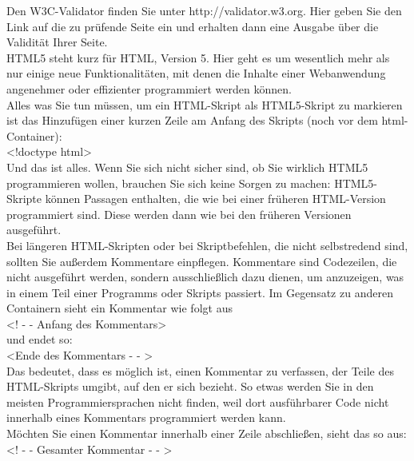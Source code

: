 Den W3C-Validator finden Sie unter http://validator.w3.org. Hier geben Sie den Link auf die zu prüfende Seite ein und erhalten dann eine Ausgabe über die Validität Ihrer Seite.\\

HTML5 steht kurz für HTML, Version 5. Hier geht es um wesentlich mehr als nur einige neue Funktionalitäten, mit denen die Inhalte einer Webanwendung angenehmer oder effizienter programmiert werden können.\\

Alles was Sie tun müssen, um ein HTML-Skript als HTML5-Skript zu markieren ist das Hinzufügen einer kurzen Zeile am Anfang des Skripts (noch vor dem html-Container):\\

<!doctype html>\\

Und das ist alles. Wenn Sie sich nicht sicher sind, ob Sie wirklich HTML5 programmieren wollen, brauchen Sie sich keine Sorgen zu machen: HTML5-Skripte können Passagen enthalten, die wie bei einer früheren HTML-Version programmiert sind. Diese werden dann wie bei den früheren Versionen ausgeführt.\\

Bei längeren HTML-Skripten oder bei Skriptbefehlen, die nicht selbstredend sind, sollten Sie außerdem Kommentare einpflegen. Kommentare sind Codezeilen, die nicht ausgeführt werden, sondern ausschließlich dazu dienen, um anzuzeigen, was in einem Teil einer Programms oder Skripts passiert. Im Gegensatz zu anderen Containern sieht ein Kommentar wie folgt aus\\

<! - - Anfang des Kommentars>\\

und endet so:\\

<Ende des Kommentars - - >\\

Das bedeutet, dass es möglich ist, einen Kommentar zu verfassen, der Teile des HTML-Skripts umgibt, auf den er sich bezieht. So etwas werden Sie in den meisten Programmiersprachen nicht finden, weil dort ausführbarer Code nicht innerhalb eines Kommentars programmiert werden kann.\\

Möchten Sie einen Kommentar innerhalb einer Zeile abschließen, sieht das so aus:\\

<! - - Gesamter Kommentar - - >\\

